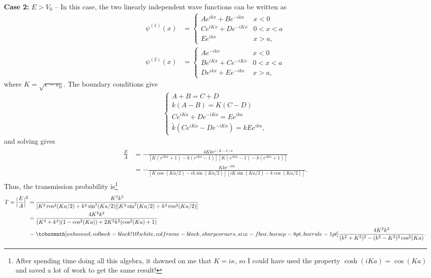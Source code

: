 {\textbf{Case 2:} $E > V_0$ -- In this case, the two linearly independent wave functions can be written as
\begin{align}
    \psi^{(1)}(x) &= \begin{cases}
       A e^{i k x} + B e^{-ikx} & x < 0 \\
       C e^{i K x} + D e^{-i K x} & 0 < x < a \\
       E e^{i k x} & x > a
   ,\end{cases} \\
    \psi^{(2)}(x) &= \begin{cases}
        A e^{-ikx} & x < 0 \\
        B e^{i K x} + C e^{-i K x} & 0 < x < a \\
        D e^{ikx} + E e^{-ikx} & x > a
    ,\end{cases}
\end{align}
where $K = \sqrt{\epsilon - v_0}$.
The boundary conditions give
\begin{eqnarray}
\begin{cases}
    A + B = C + D \\
    k(A - B) = K (C - D) \\
    Ce^{i K a} + D e^{-i K a} = E e^{i k a} \\
    \tilde{k}( Ce^{i K a} - D e^{-i K a}) = k E e^{i k a}
,\end{cases}
\end{eqnarray}
and solving gives
\begin{eqnarray}
    \begin{aligned}
        \frac{E}{A} &= -\frac{4 K k e^{i(K - k)a}}{[K(e^{i K a} + 1) - k(e^{i K a} - 1)][K(e^{i K a} - 1) - k(e^{i K a} + 1)]} \\
                    &= -\frac{K k e^{-i k a}}{[K\cos{(K a/2)} - ik \sin{(K a /2)}][iK\sin{(K a/2)} - k\cos{(K a/2)}]}
    .\end{aligned}
\end{eqnarray}
Thus, the transmission probability is\footnote{After spending time doing all this algebra, it dawned on me that $K = i\kappa$, so I could have used the property $\cosh(iKa) = \cos(Ka)$ and saved a lot of work to get the same result!}
\begin{eqnarray}
    \begin{aligned}
        T = \Big| \frac{E}{A} \Big|^2 &= \frac{K^2 k^2}{[K^2 \cos^2(K a/2) + k^2 \sin^2(K a/2)][K^2 \sin^2(K a/2) + k^2 \cos^2(K a/2)]} \\
                                      &= \frac{4K^2 k^2}{(K^{4} + k^{4})(1 - \cos^2(Ka)) + 2K^2k^2(\cos^2(Ka) + 1)} \\
                                      &= \eqbox{ \frac{4 K^2 k^2}{(k^2 + K^2)^2 - (k^2 - K^2)^2\cos^2(Ka)} }
    .\end{aligned}
\end{eqnarray}

}
